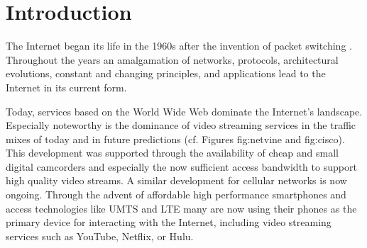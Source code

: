 \chapter{Introduction}

The Internet began its life in the 1960s after the invention of packet switching \cite{baran1964distributed}. Throughout the years an amalgamation of networks, protocols, architectural evolutions, constant and changing principles, and applications lead to the Internet in its current form.

Today, services based on the World Wide Web dominate the Internet's landscape. Especially noteworthy is the dominance of video streaming services in the traffic mixes of today and in future predictions (cf. Figures fig:netvine and fig:cisco). This development was supported through the availability of cheap and small digital camcorders and especially the now sufficient access bandwidth to support high quality video streams.
A similar development for cellular networks is now ongoing. Through the advent of affordable high performance smartphones and access technologies like UMTS and LTE many are now using their phones as the primary device for interacting with the Internet, including video streaming services such as YouTube, Netflix, or Hulu.

